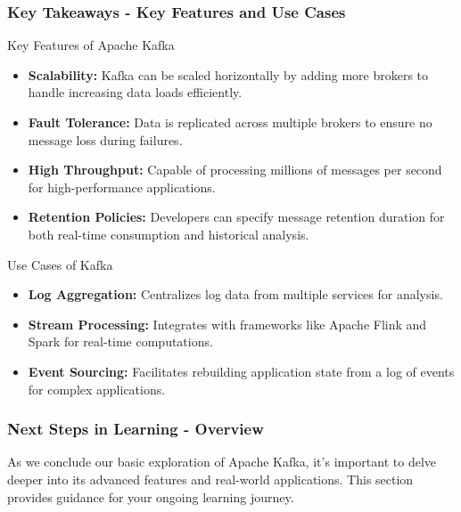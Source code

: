\documentclass[aspectratio=169]{beamer}
\begin{document}
\begin{frame}[fragile]
    \frametitle{Key Takeaways - Key Features and Use Cases}
    \begin{block}{Key Features of Apache Kafka}
        \begin{itemize}
            \item \textbf{Scalability:} Kafka can be scaled horizontally by adding more brokers to handle increasing data loads efficiently.
            \item \textbf{Fault Tolerance:} Data is replicated across multiple brokers to ensure no message loss during failures.
            \item \textbf{High Throughput:} Capable of processing millions of messages per second for high-performance applications.
            \item \textbf{Retention Policies:} Developers can specify message retention duration for both real-time consumption and historical analysis.
        \end{itemize}
    \end{block}
    
    \begin{block}{Use Cases of Kafka}
        \begin{itemize}
            \item \textbf{Log Aggregation:} Centralizes log data from multiple services for analysis.
            \item \textbf{Stream Processing:} Integrates with frameworks like Apache Flink and Spark for real-time computations.
            \item \textbf{Event Sourcing:} Facilitates rebuilding application state from a log of events for complex applications.
        \end{itemize}
    \end{block}
\end{frame}

\begin{frame}[fragile]
  \frametitle{Next Steps in Learning - Overview}
  As we conclude our basic exploration of Apache Kafka, it's important to delve deeper into its advanced features and real-world applications. This section provides guidance for your ongoing learning journey.
\end{frame}
\end{document}
